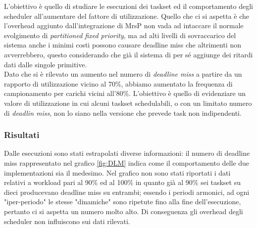 {\noindent L'obiettivo è quello di studiare le esecuzioni dei taskset ed il comportamento degli scheduler all'aumentare del fattore di utilizzazione. Quello che ci si aspetta è che l'overhead aggiunto dall'integrazione di MrsP non vada ad intaccare il normale svolgimento di \textit{partitioned fixed priority}, ma ad alti livelli di sovraccarico del sistema anche i minimi costi possono causare deadline miss che altrimenti non avverrebbero, questo considerando che già il sistema di per sé aggiunge dei ritardi dati dalle singole primitive.\\

\noindent Dato che si è rilevato un aumento nel numero di \textit{deadline miss} a partire da un rapporto di utilizzazione vicino al 70\%, abbiamo aumentato la frequenza di campionamento per carichi vicini all'80\%. L'obiettivo è quello di evidenziare un valore di utilizzazione in cui alcuni taskset schedulabili, o con un limitato numero di \textit{deadlin miss}, non lo siano nella versione che prevede task non indipendenti.


\subsubsection{Risultati}
\label{sec:confronto_norisorsa_ris}

\noindent Dalle esecuzioni sono stati estrapolati diverse informazioni: il numero di deadline miss rappresentato nel grafico \ref{fig:DLM} indica come il comportamento delle due implementazioni sia il medesimo. Nel grafico non sono stati riportati i dati relativi a workload pari al 90\% ed al 100\% in quanto già al 90\% sei taskset su dieci producevano deadline miss su entrambi; essendo i periodi armonici, ad ogni "iper-periodo" le stesse "dinamiche" sono ripetute fino alla fine dell'esecuzione, pertanto ci si aspetta un numero molto alto. Di conseguenza gli overhead degli scheduler non influiscono sui dati rilevati.\\

}

